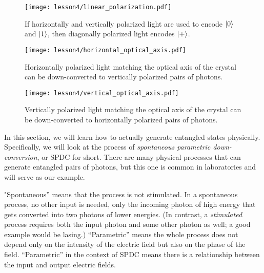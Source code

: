 \begin{figure}[H]
    \centering
    \texttt{[image: lesson4/linear\_polarization.pdf]}
    
        \caption[Horizontally, vertically and diagonally polarized light]{If horizontally and vertically polarized light are used to encode $\left| 0 \right\rangle$ and $\left| 1 \right\rangle$, then diagonally polarized light encodes $\left| + \right\rangle$.}
    
    \label{fig:hvd-light}
\end{figure}

\begin{figure}[H]
    \centering
    \texttt{[image: lesson4/horizontal\_optical\_axis.pdf]}
    
        \caption[Horizontal to vertical SPDC]{Horizontally polarized light matching the optical axis of the crystal can be down-converted to vertically polarized pairs of photons.}
    
    \label{fig:horizontal-opt-axis}
\end{figure}

\begin{figure}[H]
   \centering
    \texttt{[image: lesson4/vertical\_optical\_axis.pdf]}
    
        \caption[Vertical to horizontal SPDC]{Vertically polarized light matching the optical axis of the crystal can be down-converted to horizontally polarized pairs of photons.}
    
    \label{fig:vertical-opt-axis}
\end{figure}


In this section, we will learn how to actually generate entangled states physically. Specifically, we will look at the process of \emph{spontaneous parametric down-conversion}, or SPDC for short. There are many physical processes that can generate entangled pairs of photons, but this one is  common in laboratories and will serve as our example. 

"Spontaneous” means that the process is not stimulated.
In a spontaneous process, no other input is needed, only the incoming photon of high energy that gets converted into two photons of lower energies.
(In contrast, a \emph{stimulated} process requires both the input photon and some other photon as well; a good example would be lasing.) “Parametric” means the whole process does not depend only on the intensity of the electric field but also on the phase of the field. “Parametric” in the context of SPDC means there is a relationship between the input and output electric fields.

